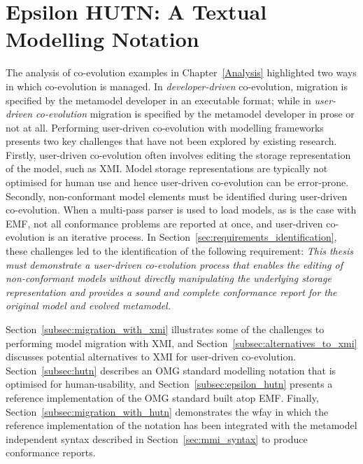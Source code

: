 
\section{Epsilon HUTN: A Textual Modelling Notation}
\label{sec:notation}
The analysis of co-evolution examples in Chapter~\ref{Analysis} highlighted two ways in which co-evolution is managed. In \emph{developer-driven} co-evolution, migration is specified by the metamodel developer in an executable format; while in \emph{user-driven co-evolution} migration is specified by the metamodel developer in prose or not at all. Performing user-driven co-evolution with modelling frameworks presents two key challenges that have not been explored by existing research. Firstly, user-driven co-evolution often involves editing the storage representation of the model, such as XMI. Model storage representations are typically not optimised for human use and hence user-driven co-evolution can be error-prone. Secondly, non-conformant model elements must be identified during user-driven co-evolution. When a multi-pass parser is used to load models, as is the case with EMF, not all conformance problems are reported at once, and user-driven co-evolution is an iterative process. In Section~\ref{sec:requirements_identification}, these challenges led to the identification of the following requirement: \emph{This thesis must demonstrate a user-driven co-evolution process that enables the editing of non-conformant models without directly manipulating the underlying storage representation and provides a sound and complete conformance report for the original model and evolved metamodel.}

Section~\ref{subsec:migration_with_xmi} illustrates some of the challenges to performing model migration with XMI, and Section~\ref{subsec:alternatives_to_xmi} discusses potential alternatives to XMI for user-driven co-evolution. Section~\ref{subsec:hutn} describes an OMG standard modelling notation that is optimised for human-usability, and Section~\ref{subsec:epsilon_hutn} presents a reference implementation of the OMG standard built atop EMF. Finally, Section~\ref{subsec:migration_with_hutn} demonstrates the wƒay in which the reference implementation of the notation has been integrated with the metamodel independent syntax described in Section~\ref{sec:mmi_syntax} to produce conformance reports. 

